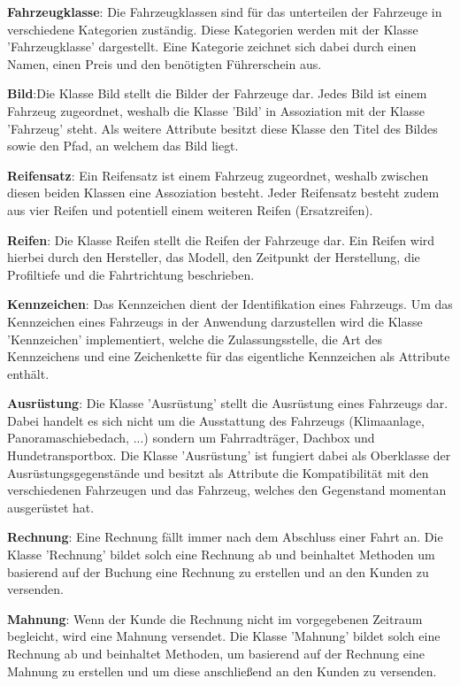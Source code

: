\textbf{Fahrzeugklasse}: Die Fahrzeugklassen sind für das unterteilen der Fahrzeuge in verschiedene Kategorien zuständig. Diese Kategorien werden mit der Klasse 'Fahrzeugklasse' dargestellt. Eine Kategorie zeichnet sich dabei durch einen Namen, einen Preis und den benötigten Führerschein aus.

\textbf{Bild}:Die Klasse Bild stellt die Bilder der Fahrzeuge dar. Jedes Bild ist einem Fahrzeug zugeordnet, weshalb die Klasse 'Bild' in Assoziation mit der Klasse 'Fahrzeug' steht. Als weitere Attribute besitzt diese Klasse den Titel des Bildes sowie den Pfad, an welchem das Bild liegt.

\textbf{Reifensatz}: Ein Reifensatz ist einem Fahrzeug zugeordnet, weshalb zwischen diesen beiden Klassen eine Assoziation besteht. Jeder Reifensatz besteht zudem aus vier Reifen und potentiell einem weiteren Reifen (Ersatzreifen).

\textbf{Reifen}: Die Klasse Reifen stellt die Reifen der Fahrzeuge dar. Ein Reifen wird hierbei durch den Hersteller, das Modell, den Zeitpunkt der Herstellung, die Profiltiefe und die Fahrtrichtung beschrieben.

\textbf{Kennzeichen}: Das Kennzeichen dient der Identifikation eines Fahrzeugs. Um das Kennzeichen eines Fahrzeugs in der Anwendung darzustellen wird die Klasse 'Kennzeichen' implementiert, welche die Zulassungsstelle, die Art des Kennzeichens und eine Zeichenkette für das eigentliche Kennzeichen als Attribute enthält.

\textbf{Ausrüstung}: Die Klasse 'Ausrüstung' stellt die Ausrüstung eines Fahrzeugs dar. Dabei handelt es sich nicht um die Ausstattung des Fahrzeugs (Klimaanlage, Panoramaschiebedach, ...) sondern um Fahrradträger, Dachbox und Hundetransportbox. Die Klasse 'Ausrüstung' ist fungiert dabei als Oberklasse der Ausrüstungsgegenstände und besitzt als Attribute die Kompatibilität mit den verschiedenen Fahrzeugen und das Fahrzeug, welches den Gegenstand momentan ausgerüstet hat.

\textbf{Rechnung}: Eine Rechnung fällt immer nach dem Abschluss einer Fahrt an. Die Klasse 'Rechnung' bildet solch eine Rechnung ab und beinhaltet Methoden um basierend auf der Buchung eine Rechnung zu erstellen und an den Kunden zu versenden.

\textbf{Mahnung}: Wenn der Kunde die Rechnung nicht im vorgegebenen Zeitraum begleicht, wird eine Mahnung versendet. Die Klasse 'Mahnung' bildet solch eine Rechnung ab und beinhaltet Methoden, um basierend auf der Rechnung eine Mahnung zu erstellen und um diese anschließend an den Kunden zu versenden.

